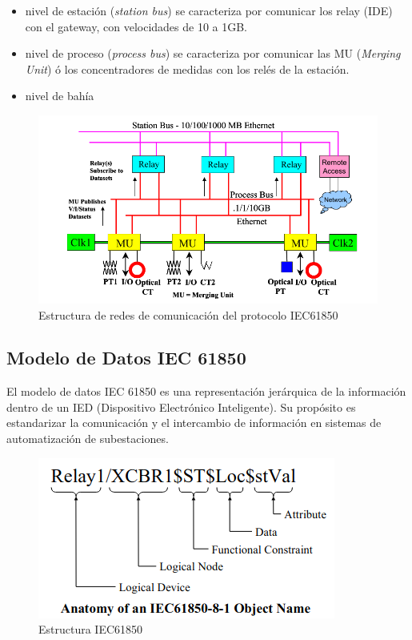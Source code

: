 \documentclass[a5paper]{book}%
\begin{document}
\begin{itemize}
\item nivel de estación (\textit{station bus}) se caracteriza por comunicar los relay (IDE)  con el gateway,  con velocidades de 10 a 1GB.
\item nivel de proceso (\textit{process bus}) se caracteriza por comunicar las MU (\textit{Merging Unit}) ó los concentradores de medidas con los relés de la estación.
\item nivel de bahía
\end{itemize}

\begin{figure}[H]
  \centering
  
  \caption{Estructura de redes de comunicación del protocolo IEC61850}
  \label{fig:iec61850}
  \includegraphics[width=\linewidth]{iec61850}
\end{figure}



\subsection{Modelo de Datos IEC 61850}

El modelo de datos IEC 61850 es una representación jerárquica de la información dentro de un IED (Dispositivo Electrónico Inteligente). Su propósito es estandarizar la comunicación y el intercambio de información en sistemas de automatización de subestaciones.

\begin{figure}[H]
  \centering
  \caption{Estructura IEC61850}
  \label{fig:iec61850}
  \includegraphics[width=0.5\linewidth]{anatomia_iec}
\end{figure}
\end{document}
